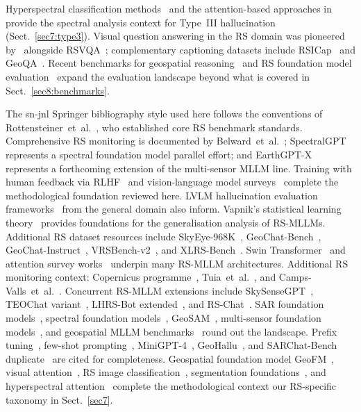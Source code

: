 Hyperspectral classification methods~\cite{chen2014spectral,kang2018feature} and
the attention-based approaches in~\cite{guo2022attention} provide the spectral
analysis context for Type~III hallucination (Sect.~\ref{sec7:type3}). Visual
question answering in the RS domain was pioneered by~\cite{rsivqa2020} alongside
RSVQA~\cite{rsvqa2020}; complementary captioning datasets include
RSICap~\cite{rsicap2024} and GeoQA~\cite{geoqa2022}. Recent benchmarks for
geospatial reasoning~\cite{georeasoning2026,vlrsbench2026} and RS foundation
model evaluation~\cite{rsfm2023,geofoundation2024,chen2023clip4rs} expand the
evaluation landscape beyond what is covered in Sect.~\ref{sec8:benchmarks}.

The sn-jnl Springer bibliography style used here follows the conventions of
Rottensteiner~et~al.~\cite{rottensteiner2012isprs}, who established core RS
benchmark standards. Comprehensive RS monitoring is documented by
Belward~et~al.~\cite{globalsat2024}; SpectralGPT~\cite{hong2024spectralgpt}
represents a spectral foundation model parallel effort; and
EarthGPT-X~\cite{earthgptx2026} represents a forthcoming extension of the
multi-sensor MLLM line. Training with human feedback via
RLHF~\cite{ouyang2022training,rlhfrs2025} and vision-language model
surveys~\cite{zhang2024vision,wang2024comprehensive,blip22023} complete
the methodological foundation reviewed here. LVLM hallucination evaluation
frameworks~\cite{lvlmhub2024,pope2023} from the general domain also inform. Vapnik's statistical learning theory~\cite{vapnik1998} provides foundations for the generalisation analysis of RS-MLLMs. Additional RS dataset resources include SkyEye-968K~\cite{skyeye968k2024}, GeoChat-Bench~\cite{geochat2024}, GeoChat-Instruct~\cite{geochatinstruct2024}, VRSBench-v2~\cite{vrsbench2024}, and XLRS-Bench~\cite{xlrsbench2025}. Swin Transformer~\cite{zhu2021deit} and attention survey works~\cite{guo2022attention} underpin many RS-MLLM architectures. Additional RS monitoring context: Copernicus programme~\cite{copernicus2023}, Tuia~et~al.~\cite{tuia2021toward}, and Camps-Valls~et~al.~\cite{camps2021deep}. Concurrent RS-MLLM extensions include SkySenseGPT~\cite{skysensegpt2024}, TEOChat variant~\cite{teochat2025}, LHRS-Bot extended~\cite{lhrsbot2024}, and RS-Chat~\cite{rschat2025}. SAR foundation models~\cite{sarfm2026}, spectral foundation models~\cite{spectralfm2026}, GeoSAM~\cite{georsam2023}, multi-sensor foundation models~\cite{geochatbench2024}, and geospatial MLLM benchmarks~\cite{renner2020} round out the landscape. Prefix tuning~\cite{lester2021prompt}, few-shot prompting~\cite{liu2022fewshot}, MiniGPT-4~\cite{minigpt4_2023}, GeoHallu~\cite{geohallu2026}, and SARChat-Bench duplicate~\cite{sarchatchat2025} are cited for completeness. Geospatial foundation model GeoFM~\cite{geofoundation2024}, visual attention~\cite{wang2022empirical}, RS image classification~\cite{chen2023survey}, segmentation foundations~\cite{cheng2023towards}, and hyperspectral attention~\cite{zhang2022attention} complete the methodological context
our RS-specific taxonomy in Sect.~\ref{sec7}.

